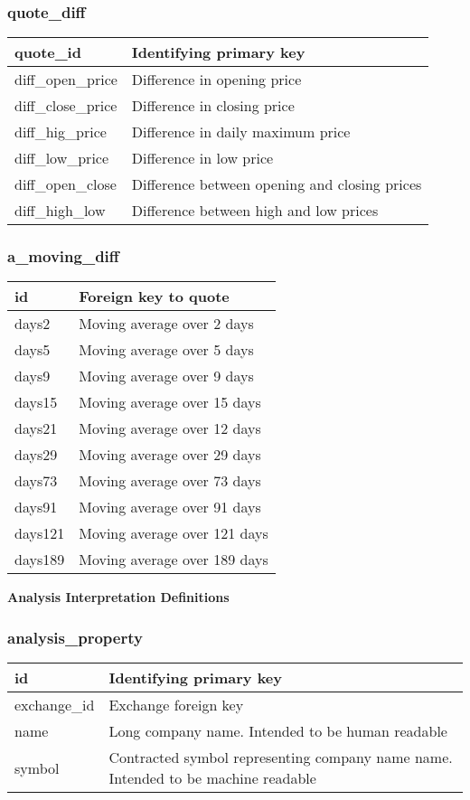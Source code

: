 \subsubsection{quote\_diff}
\begin{tabular}{|l||l|}
	\hline
	quote\_id 				& Identifying primary key \\ \hline
	diff\_open\_price		& Difference in opening price \\ \hline
	diff\_close\_price		& Difference in closing price \\ \hline
	diff\_hig\_price		& Difference in daily maximum price \\ \hline
	diff\_low\_price		& Difference in low price \\ \hline
	diff\_open\_close		& Difference between opening and closing prices\\ \hline
	diff\_high\_low			& Difference between high and low prices\\ \hline
\end{tabular}
\subsubsection{a\_moving\_diff}
\begin{tabular}{|l||l|}
	\hline
	id 				& Foreign key to quote \\ \hline
	days2			& Moving average over 2 days \\ \hline
	days5			& Moving average over 5 days \\ \hline
	days9			& Moving average over 9 days \\ \hline
	days15			& Moving average over 15 days \\ \hline
	days21			& Moving average over 12 days \\ \hline
	days29			& Moving average over 29 days \\ \hline
	days73			& Moving average over 73 days \\ \hline
	days91			& Moving average over 91 days \\ \hline
	days121			& Moving average over 121 days \\ \hline
	days189			& Moving average over 189 days \\ \hline
\end{tabular}

\par \textbf{Analysis Interpretation Definitions}
\subsubsection{analysis\_property}
\begin{tabular}{|l||l|}
	\hline
	id 				& Identifying primary key \\ \hline
	exchange\_id 	& Exchange foreign key \\ \hline
	name 			& Long company name. Intended to be human readable \\ \hline
	symbol 			& Contracted symbol representing company name name. Intended to be machine readable \\ \hline
\end{tabular}
